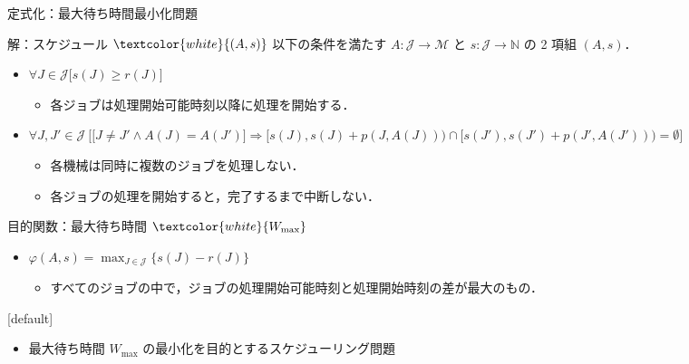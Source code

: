 \documentclass[dvipdfmx]{beamer}
\begin{document}
    \begin{frame}{定式化：最大待ち時間最小化問題}
      \begin{block}{解：スケジュール $\textcolor{white}{(A,s)}$}
        以下の条件を満たす $A : \mathcal{J} \to \mathcal{M}$ と $s : \mathcal{J} \to \mathbb{N}$ の 2 項組 $(A,s)$．
        \begin{itemize}
          \item {$\forall J \in \mathcal{J}\big[s(J) \ge r(J) \big]$}
          \begin{itemize}
            \item {各ジョブは処理開始可能時刻以降に処理を開始する．}
          \end{itemize}
          \item {$\forall J, J' \in \mathcal{J}\ \Big[ \big[J\ne J' \land A(J) = A(J')\big] \Rightarrow [s(J), s(J)+p(J,A(J))) \cap[s(J'), s(J')+p(J', A(J'))) = \emptyset \Big]$}
          \begin{itemize}
            \item {各機械は同時に複数のジョブを処理しない．}
            \item {各ジョブの処理を開始すると，完了するまで中断しない．}
          \end{itemize}
        \end{itemize}
      \end{block}

      \begin{block}{目的関数：最大待ち時間 $\textcolor{white}{W_{\max}}$}
        \begin{itemize}
          \item $\varphi(A,s) = {\displaystyle \max_{J \in \mathcal{J}}\{s(J) - r(J)\}}$
          \begin{itemize}
            \item すべてのジョブの中で，ジョブの処理開始可能時刻と処理開始時刻の差が最大のもの．
          \end{itemize}
        \end{itemize}
      \end{block}

      [default]
      \begin{itemize}
        \item 最大待ち時間 $W_{\max}$ の最小化を目的とするスケジューリング問題
      \end{itemize}
    \end{frame}
\end{document}
